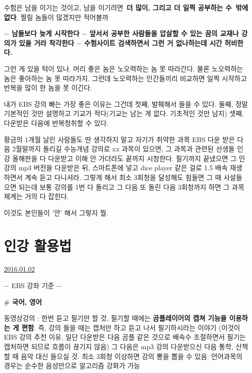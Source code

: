 수험은 남을 이기는 것이고, 남을 이기려면 \textbf{더 많이, 그리고 더 일찍 공부하는 수 밖에 없다}.
찔릴 놈들이 많겠지만 적어볼까
\vspace{5mm}

\textbf{$-$ 남들보다 늦게 시작한다}
\textbf{$-$ 앞서서 공부한 사람들을 압살할 수 있는 꿈의 교재나 강의가 있을 거라 착각한다}
\textbf{$-$ 수험사이트 검색하면서 그런 거 없나하는데 시간 허비한다.}
\vspace{5mm}

그런 게 있을 턱이 있나.
머리 좋은 놈은 노오력하는 놈 못 따라간다. 물론 노오력하는 놈은 좋아하는 놈 못 따라가지.
그런데 노오력하는 인간들끼리 비교하면 일찍 시작하고 반복을 많이 한 놈을 못 이긴다.
\vspace{5mm}

내가 EBS 강의 빠는 가장 좋은 이유는 그건데
첫째, 발췌해서 들을 수 있다.
둘째, 정말 기본적인 것만 설명하고 기교가 적다(기교는 남는 게 없다. 기초적인 것만 남지)
셋째, 다운받은 다음에 반복청취할 수 있다.
\vspace{5mm}

황금의 1개월 날린 사람들도 딴 생각하지 말고 자기가 취약한 과목 EBS 다운 받은 다음 2월말까지 돌리길
수능개념 강의로 xx 과목이 있으면, 그 과목과 관련된 선생들 인강 올해판을 다 다운받고 이해 안 가더라도 끝까지 시청한다.
필기까지 끝냈으면 그 인강의 mp3 버전을 다운받은 뒤, 스마트폰에 넣고 dice player 같은 걸로 1.5 배속 재생하면서 계속 듣고 다니셔라.
그렇게 해서 최소 3회청을 달성해도 힘들면 그 때 사설들으면 되는데
보통 강의를 1번 다 돌리고 그 다음 또 돌린 다음 3회청까지 하면 그 과목 체계는 거의 다 잡힌다.
\vspace{5mm}

이것도 본인들이 '안' 해서 그렇지 뭘.
\vspace{5mm}






\section{인강 활용법}
\href{https://www.kockoc.com/Apoc/572680}{2016.01.02}

\vspace{5mm}

$-$ EBS 강좌 기준 $-$
\vspace{5mm}

\textbf{$\#$ 국어, 영어}
\vspace{5mm}

동영상강의 : 한번 듣고 필기만 할 것,
필기할 때에는 \textbf{곰플레이어의 캡쳐 기능을 이용하는 게 편함}. 즉, 강의 들을 때는 캡처만 하고 듣고 나서 필기하시라는 이야기
(이것이 EBS 강의 추천 이유, 일단 다운받은 다음 곰플 같은 것으로 배속수 조절하면서 필기는 캡처하면 되므로 흐름이 끊기지 않음)
그 다음은 mp3 강의 다운받으신 다음 통학, 산책할 때 음악 대신 들으실 것. 최소 3회청 이상하면 강의 뽕을 뽑을 수 있음.
언어과목의 경우는 순수한 음성만으로 알고리즘 강화가 가능
\vspace{5mm}

